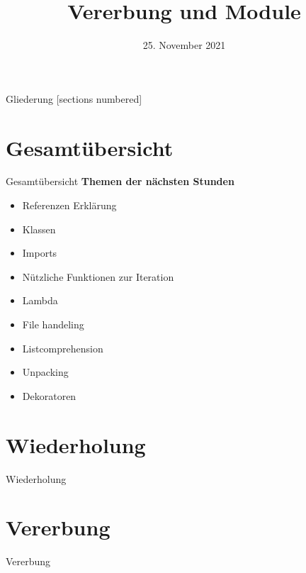 



\title{Vererbung und Module}
\date{25. November 2021}


	
\maketitle

\begin{frame}{Gliederung}
	[sections numbered]
	\tableofcontents
\end{frame}

\section*{Gesamtübersicht}
\begin{frame}{Gesamtübersicht}
	\textbf{Themen der nächsten Stunden}
	\begin{itemize}
		\item Referenzen Erklärung
		\item  \alert{Klassen}
		\item \alert{Imports}
		\item Nützliche Funktionen zur Iteration
		\item Lambda
		\item File handeling
		\item Listcomprehension
		\item Unpacking
		\item Dekoratoren
	\end{itemize}
\end{frame}

\section{Wiederholung}
\begin{frame}{Wiederholung}
	
\end{frame}

\section{Vererbung}
\begin{frame}{Vererbung}
	
\end{frame}

